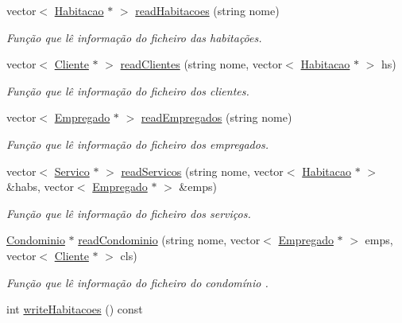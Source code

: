 \begin{DoxyCompactItemize}
\item 
vector$<$ \hyperlink{class_habitacao}{Habitacao} $\ast$ $>$ \hyperlink{class_interface_ac5c02d4729f367854894d776700c73e1}{read\+Habitacoes} (string nome)
\begin{DoxyCompactList}\small\item\em Função que lê informação do ficheiro das habitações. \end{DoxyCompactList}\item 
vector$<$ \hyperlink{class_cliente}{Cliente} $\ast$ $>$ \hyperlink{class_interface_a64c5438e231b213e34202d3aa5142551}{read\+Clientes} (string nome, vector$<$ \hyperlink{class_habitacao}{Habitacao} $\ast$ $>$ hs)
\begin{DoxyCompactList}\small\item\em Função que lê informação do ficheiro dos clientes. \end{DoxyCompactList}\item 
vector$<$ \hyperlink{class_empregado}{Empregado} $\ast$ $>$ \hyperlink{class_interface_a719ad8dd429ca064eca273ef2adb53b7}{read\+Empregados} (string nome)
\begin{DoxyCompactList}\small\item\em Função que lê informação do ficheiro dos empregados. \end{DoxyCompactList}\item 
vector$<$ \hyperlink{class_servico}{Servico} $\ast$ $>$ \hyperlink{class_interface_a7de789c23586f0a60ce25cab10c1180d}{read\+Servicos} (string nome, vector$<$ \hyperlink{class_habitacao}{Habitacao} $\ast$ $>$ \&habs, vector$<$ \hyperlink{class_empregado}{Empregado} $\ast$ $>$ \&emps)
\begin{DoxyCompactList}\small\item\em Função que lê informação do ficheiro dos serviços. \end{DoxyCompactList}\item 
\hyperlink{class_condominio}{Condominio} $\ast$ \hyperlink{class_interface_aad0389d5ba75100fb309aa26a1ba78d7}{read\+Condominio} (string nome, vector$<$ \hyperlink{class_empregado}{Empregado} $\ast$ $>$ emps, vector$<$ \hyperlink{class_cliente}{Cliente} $\ast$ $>$ cls)
\begin{DoxyCompactList}\small\item\em Função que lê informação do ficheiro do condomínio . \end{DoxyCompactList}\item 
int \hyperlink{class_interface_a0acacceb85d6df6726a339a1c3ab5f79}{write\+Habitacoes} () const 

\end{DoxyCompactItemize}
